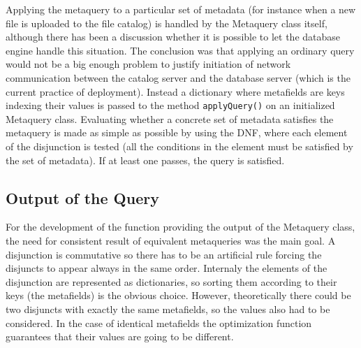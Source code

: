Applying the metaquery to a particular
set of metadata (for instance when a new file is uploaded to the file catalog) is handled by the Metaquery class 
itself, although there has been a discussion whether it is possible to let the database engine handle this 
situation. The conclusion was that applying an ordinary query would not be a big enough problem to 
justify initiation of network communication between the catalog server and the database server (which is the 
current practice of deployment). Instead a dictionary where metafields are keys indexing their values is passed 
to the method \texttt{applyQuery()} on an initialized Metaquery class. Evaluating whether a concrete set of 
metadata satisfies the metaquery is made as simple as possible by using the DNF, where each element of the 
disjunction is tested (all the conditions in the element must be satisfied by the set of metadata). If at least
one passes, the query is satisfied.

\subsection{Output of the Query}

For the development of the function providing the output of the Metaquery class, the need for consistent result of equivalent 
metaqueries was the main goal. A disjunction is commutative so there has to be an artificial rule forcing the 
disjuncts to appear always in the same order. Internaly the elements of the disjunction are represented as 
dictionaries, so sorting them according to their keys (the metafields) is the obvious choice. However, theoretically
there could be two disjuncts with exactly the same metafields, so the values also had to be considered. In
the case of identical metafields the optimization function guarantees that their values are going to be different.